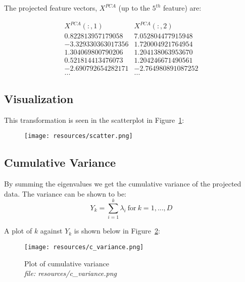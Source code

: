 \documentclass{article}
\begin{document}
\begin{multicols}{2}
    The projected feature vectors, $X^{PCA}$ (up to the $5^{th}$ feature) are:
    
    \begin{equation*}
    \begin{matrix}
        X^{PCA}(:,1) & X^{PCA}(:,2) \\
        0.822813957179058 &  7.052804477915948 \\
  -3.329330363017356  & 1.720004921764954 \\
   1.304069800790206  & 1.204138063953670 \\ 
   0.521814413476073  & 1.204246671490561 \\
  -2.690792654282171 &  -2.764980891087252 \\
        ... & ...
    \end{matrix}
    \end{equation*}
    
    \subsection{Visualization}
    This transformation is seen in the scatterplot in Figure~\ref{fig:fig1}:

    \begin{figure}[H]
        \texttt{[image: resources/scatter.png]}
        \label{fig:fig1} 
    \end{figure}
    
    \subsection{Cumulative Variance}
    By summing the eigenvalues we get the cumulative variance of the projected data.
    The variance can be shown to be:
    \begin{equation}
        Y_k = \sum_{i=1}^{k} \lambda_i \  \textrm{for} \  k = 1,...,D
    \end{equation}
    
    A plot of $k$ against $Y_k$ is shown below in Figure~\ref{fig:fig2}:
    
    \begin{figure}[H]
        \texttt{[image: resources/c\_variance.png]}
        \caption{Plot of cumulative variance \\\textit{file: resources/c\_variance.png}}
        \label{fig:fig2}
    \end{figure} 


\end{multicols}
\end{document}
